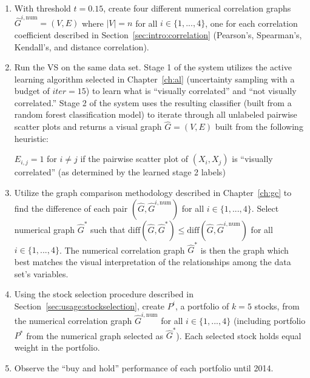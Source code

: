 \tablespacing
\begin{enumerate}
	\item With threshold $t = 0.15$, create four different numerical 
	correlation graphs $\hat{G}^{i,\text{num}}=(V,E)$ where $|V| = n$ for all 
	$i\in \{1,...,4\}$, one for each correlation coefficient described in 
	Section~\ref{sec:intro:correlation} (Pearson's, Spearman's, Kendall's, and 
	distance correlation).
	
	\item Run the VS on the same data set. Stage 1 of the system utilizes the 
	active learning algorithm selected in Chapter~\ref{ch:al} (uncertainty 
	sampling with a budget of $iter = 15$) to learn what is 
	``visually correlated'' and ``not visually correlated.'' Stage 2 of the 
	system uses the resulting classifier (built from a random forest 
	classification model) to iterate through all unlabeled pairwise scatter 
	plots and returns a visual graph $\hat{G}=(V,E)$ built from the following 
	heuristic:

\begin{algorithm}
	$E_{i,j} = 1$ for $i\neq j$ if the pairwise scatter plot of $(X_i, X_j)$ 
	is ``visually correlated'' (as determined by the learned stage 2 labels)
\end{algorithm}

	\item Utilize the graph comparison methodology described in 
	Chapter~\ref{ch:gc} to find the difference of each pair 
	$(\hat{G},\hat{G}^{i,\text{num}})$ for all $i \in \{1,...,4\}$. Select 
	numerical graph $\hat{G}^*$ such 
	that $\text{diff}(\hat{G},\hat{G}^*) \leq 
	\text{diff}(\hat{G},\hat{G}^{i,\text{num}})$ for all $i\in 
	\{1,...,4\}$. The numerical correlation graph $\hat{G}^*$ is then the graph 
	which best matches the visual interpretation of the relationships among the 
	data set's variables.
	
	\item Using the stock selection procedure described in 
	Section~\ref{sec:usage:stockselection}, create $P^i$, a portfolio of $k = 
	5$ stocks, from the numerical correlation graph $\hat{G}^{i,\text{num}}$ 
	for all $i \in \{1,...,4\}$ (including portfolio 
	$P^*$ from the numerical graph selected as $\hat{G}^*$). Each selected 
	stock holds equal weight in the portfolio.
	
	\item Observe the ``buy and hold'' performance of each portfolio until 2014.
\end{enumerate}
\bodyspacing

